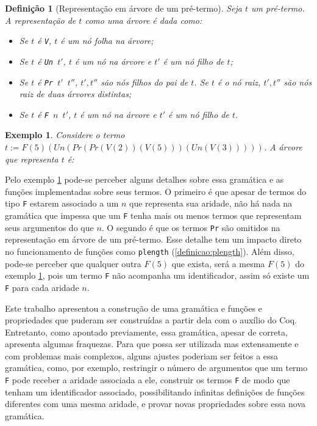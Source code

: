 \documentclass{article}
\newtheorem{definicao}{Definição}
\newtheorem{exemplo}{Exemplo}
\begin{document}
\begin{definicao}[Representação em árvore de um pré-termo]
	Seja $t$ um pré-termo. A representação de $t$ como uma árvore é dada como:

	\begin{itemize}
		\item Se $t$ é \texttt{V}, $t$ é um nó folha na árvore;
		\item Se $t$ é \texttt{Un $t'$}, $t$ é um nó na árvore e $t'$ é um nó filho de $t$;
		\item Se $t$ é \texttt{Pr $t'$ $t''$}, $t',t''$ são nós filhos do pai de $t$. Se $t$ é o nó raiz, $t',t''$ são nós raiz de duas árvores distintas;
		\item Se $t$ é \texttt{F $n$ $t'$}, $t$ é um nó na árvore e $t'$ é um nó filho de $t$.
	\end{itemize}
	\label{definicao:pre-termo_arvore}

\end{definicao}
\begin{exemplo}
	Considere o termo $t := F (5) (Un (Pr (Pr (V (2)) (V (5))) (Un (V (3)))))$. A árvore que representa $t$ é:
	\label{exemplo:pre-termo_arvore}
\end{exemplo}

\hspace*{\fill}
\hspace*{\fill}

Pelo exemplo \ref{exemplo:pre-termo_arvore} pode-se perceber alguns detalhes sobre essa gramática e as funções implementadas sobre seus termos. O primeiro é que apesar de termos do tipo \texttt{F} estarem associado a um $n$ que representa sua aridade, não há nada na gramática que impessa que um \texttt{F} tenha mais ou menos termos que representam seus argumentos do que $n$. O segundo é que os termos \texttt{Pr} são omitidos na representação em árvore de um pré-termo. Esse detalhe tem um impacto direto no funcionamento de funções como \texttt{plength} (\ref{definicao:plength}). Além disso, pode-se perceber que qualquer outra $F (5)$ que exista, será a mesma $F (5)$ do exemplo \ref{exemplo:pre-termo_arvore}, pois um termo \texttt{F} não acompanha um identificador, assim só existe um \texttt{F} para cada aridade $n$.

Este trabalho apresentou a construção de uma gramática e funções e propriedades que puderam ser construídas a partir dela com o auxílio do Coq. Entretanto, como apontado previamente, essa gramática, apesar de correta, apresenta algumas fraquezas. Para que possa ser utilizada mas extensamente e com problemas mais complexos, alguns ajustes poderiam ser feitos a essa gramática, como, por exemplo, restringir o número de argumentos que um termo \texttt{F} pode receber a aridade associada a ele, construir os termos \texttt{F} de modo que tenham um identificador associado, possibilitando infinitas definições de funções diferentes com uma mesma aridade, e provar novas propriedades sobre essa nova gramática.
\end{document}
